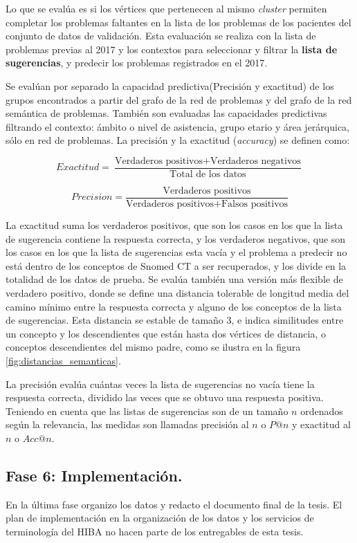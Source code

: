 \begin{itemize}
Lo que se evalúa es si los vértices que pertenecen al mismo \textit{cluster} permiten completar los problemas faltantes en la lista de los problemas de los pacientes del conjunto de datos de validación. Esta evaluación se realiza con la lista de problemas previas al 2017 y los contextos para seleccionar y filtrar la  \textbf{lista de sugerencias}, y predecir los problemas registrados en el 2017.

Se evalúan por separado la capacidad predictiva(Precisión y exactitud) de los grupos encontrados a partir del grafo de la red de problemas y del grafo de la red semántica de problemas. También son evaluadas las capacidades predictivas filtrando el contexto: ámbito o nivel de asistencia, grupo etario y área jerárquica, sólo en red de problemas. La precisión y la exactitud (\textit{accuracy}) se definen como:

\begin{equation}
Exactitud = \frac{\text{Verdaderos positivos}+\text{Verdaderos negativos}}{\text{Total de los datos}}
\end{equation}

\begin{equation}
Precision = \frac{\text{Verdaderos positivos}}{\text{Verdaderos positivos}+\text{Falsos positivos}}
\end{equation}

La exactitud suma los verdaderos positivos, que son los casos en los que la lista de sugerencia contiene la respuesta correcta, y los verdaderos negativos, que son los casos en los que la lista de sugerencias esta vacía y el problema a predecir no está dentro de los conceptos de Snomed CT a ser recuperados, y los divide en la totalidad de los datos de prueba. Se evalúa también una versión más flexible de verdadero positivo, donde se define una distancia tolerable de longitud media del camino mínimo entre la respuesta correcta y alguno de los conceptos de la lista de sugerencias. Esta distancia se estable de tamaño 3, e indica similitudes entre un concepto y los descendientes que están hasta dos vértices de distancia, o conceptos descendientes del mismo padre, como se ilustra en la figura \ref{fig:distancias_semanticas}.
 
La precisión evalúa cuántas veces la lista de sugerencias no vacía tiene la respuesta correcta, dividido las veces que se obtuvo una respuesta positiva. Teniendo en cuenta que las listas de sugerencias son de un tamaño $n$ ordenados según la relevancia, las medidas son llamadas precisión al $n$ o $P@n$ y exactitud al $n$ o $Acc@n$.

 \end{itemize}
 
\subsection{Fase 6: Implementación.} En la última fase organizo los datos y redacto el documento final de la tesis. El plan de implementación en la organización de los datos y los servicios de terminología del \acrshort{HIBA} no hacen parte de los entregables de esta tesis.




